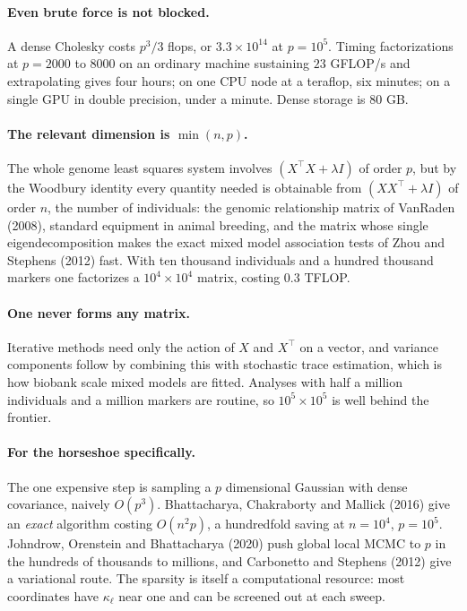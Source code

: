 \paragraph{Even brute force is not blocked.} A dense Cholesky costs $p^3/3$ flops, or
$3.3\times10^{14}$ at $p=10^5$. Timing factorizations at $p=2000$ to $8000$ on an ordinary machine
sustaining $23$ GFLOP/s and extrapolating gives four hours; on one CPU node at a teraflop, six
minutes; on a single GPU in double precision, under a minute. Dense storage is $80$ GB.

\paragraph{The relevant dimension is $\min(n,p)$.} The whole genome least squares system involves
$(X^\top X+\lambda I)$ of order $p$, but by the Woodbury identity every quantity needed is
obtainable from $(XX^\top+\lambda I)$ of order $n$, the number of individuals: the genomic
relationship matrix of VanRaden (2008), standard equipment in animal breeding, and the matrix whose single eigendecomposition makes the exact mixed model association tests of Zhou and Stephens (2012) fast. With ten thousand
individuals and a hundred thousand markers one factorizes a $10^4\times10^4$ matrix, costing $0.3$
TFLOP.

\paragraph{One never forms any matrix.} Iterative methods need only the action of $X$ and $X^\top$
on a vector, and variance components follow by combining this with stochastic trace estimation,
which is how biobank scale mixed models are fitted. Analyses with half a million individuals and a
million markers are routine, so $10^5\times10^5$ is well behind the frontier.

\paragraph{For the horseshoe specifically.} The one expensive step is sampling a $p$ dimensional
Gaussian with dense covariance, naively $O(p^3)$. Bhattacharya, Chakraborty and Mallick (2016) give
an \emph{exact} algorithm costing $O(n^2p)$, a hundredfold saving at $n=10^4$, $p=10^5$. Johndrow,
Orenstein and Bhattacharya (2020) push global local MCMC to $p$ in the hundreds of thousands to
millions, and Carbonetto and Stephens (2012) give a variational route. The sparsity is itself a
computational resource: most coordinates have $\kappa_\ell$ near one and can be screened out at
each sweep.

